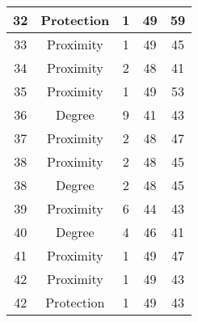\documentclass[results.tex]{subfiles}
\begin{document}
\begin{center}
\begin{tabular}{| c || c | c | c | c |}
            \hline
            32                      & Protection                   & 1                      & 49                      & 59                   \\
            \hline
            33                      & Proximity                    & 1                      & 49                      & 45                   \\
            \hline
            34                      & Proximity                    & 2                      & 48                      & 41                   \\
            \hline
            35                      & Proximity                    & 1                      & 49                      & 53                   \\
            \hline
            36                      & Degree                       & 9                      & 41                      & 43                   \\
            \hline
            37                      & Proximity                    & 2                      & 48                      & 47                   \\
            \hline
            38                      & Proximity                    & 2                      & 48                      & 45                   \\
            \hline
            38                      & Degree                       & 2                      & 48                      & 45                   \\
            \hline
            39                      & Proximity                    & 6                      & 44                      & 43                   \\
            \hline
            40                      & Degree                       & 4                      & 46                      & 41                   \\
            \hline
            41                      & Proximity                    & 1                      & 49                      & 47                   \\
            \hline
            42                      & Proximity                    & 1                      & 49                      & 43                   \\
            \hline
            42                      & Protection                   & 1                      & 49                      & 43                   \\

\end{tabular}
\end{center}
\end{document}
